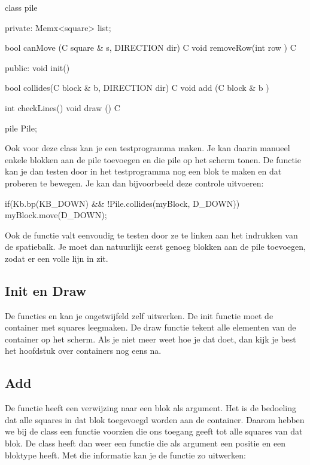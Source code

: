 \begin{code}
class pile
{
private:
   Memx<square> list;
   
   bool canMove  (C square & s,  DIRECTION dir) C {}   
   void removeRow(int row                     ) C {}
   
public:
   void init() {}
   
   bool collides(C block & b, DIRECTION dir) C {}   
   void add     (C block & b               )   {}
   
   int checkLines()   {}   
   void draw     () C {}
}

pile Pile;
\end{code}

Ook voor deze class kan je een testprogramma maken. Je kan daarin manueel enkele blokken aan de pile toevoegen en die pile op het scherm tonen. De functie  kan je dan testen door in het testprogramma nog een blok te maken en dat proberen te bewegen. Je kan dan bijvoorbeeld deze controle uitvoeren:

\begin{code}
if(Kb.bp(KB_DOWN) && !Pile.collides(myBlock, D_DOWN)) {
  myBlock.move(D_DOWN);
}
\end{code}

Ook de  functie valt eenvoudig te testen door ze te linken aan het indrukken van de spatiebalk. Je moet dan natuurlijk eerst genoeg blokken aan de pile toevoegen, zodat er een volle lijn in zit.

\subsection{Init en Draw}
De functies  en  kan je ongetwijfeld zelf uitwerken. De init functie moet de container met squares leegmaken. De draw functie tekent alle elementen van de container op het scherm. Als je niet meer weet hoe je dat doet, dan kijk je best het hoofdstuk over containers nog eens na.

\subsection{Add}
De functie  heeft een verwijzing naar een blok als argument. Het is de bedoeling dat alle squares in dat blok toegevoegd worden aan de container. Daarom hebben we bij de class  een functie voorzien die ons toegang geeft tot alle squares van dat blok. De class  heeft dan weer een functie  die als argument een positie en een bloktype heeft. Met die informatie kan je de functie zo uitwerken:

